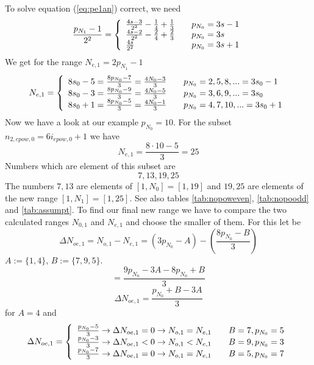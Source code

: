 \documentclass{aomart}
\theoremstyle{definition}
\begin{document}
To solve equation (\ref{eq:pe1an}) correct, we need
\[ \frac{p_{N_{1}}-1}{2^{2}} = \left\{
	\begin{array}{l@{\quad \quad}l}
	\frac{4s-3}{2^{2}} - \frac{1}{4} + \frac{1}{3} & p_{N_{0}} = 3s - 1 \\
	\frac{4s-2}{2^{2}} - \frac{2}{4} + \frac{2}{3} & p_{N_{0}} = 3s \\
	\frac{4s}{2^{2}} & p_{N_{0}} = 3s+1   
\end{array}
\right. \] 
We get for the range $N_{e,1} = 2p_{N_{1}}-1$
\begin{equation} N_{e,1} = \left\{
	\begin{array}{l@{\quad \quad}l}
	8s_{0}-5 = \frac{8p_{N_{0}}-7}{3} = \frac{4N_{0}-3}{3} & p_{N_{0}}=2,5,8,... = 3s_{0} - 1 \\
	8s_{0}-3 = \frac{8p_{N_{0}}-9}{3} = \frac{4N_{0}-5}{3} & p_{N_{0}}=3,6,9,... = 3s_{0} \\
	8s_{0}+1 = \frac{8p_{N_{0}}-5}{3} = \frac{4N_{0}-1}{3} & p_{N_{0}}=4,7,10,... = 3s_{0} + 1  
\end{array}
\right. \label{eq:Ne1} \end{equation}
Now we have a look at our example $p_{N_{0}} = 10$. For the subset $n_{2,epow,0} = 6i_{epow,0} + 1$ we have
\[ N_{e,1} = \frac{8 \cdot 10 - 5}{3} = 25 \]
Numbers which are element of this subset are
\[ 7, 13, 19, 25 \]
The numbers $7,13$ are elements of $[1,N_{0}]=[1,19]$ and $19,25$ are elements of the new range $[1,N_{1}]=[1,25]$. See also tables \ref{tab:nopoweven}, \ref{tab:nopoodd} and \ref{tab:assumpt}.
To find our final new range we have to compare the two calculated ranges $N_{0,1}$ and $N_{e,1}$ and choose the smaller of them. For this let be
\[ \Delta N_{oe,1} = N_{o,1} - N_{e,1} = \left( 3p_{N_{0}} - A \right) - \left( \frac{8p_{N_{0}}-B}{3} \right) \]
$A := \{1,4\}$, $B := \{ 7,9,5 \}$. 
\[ = \frac{9p_{N_{0}}-3A-8p_{N_{0}}+B}{3} \]
\begin{equation} \Delta N_{oe,1} = \frac{p_{N_{0}}+B-3A}{3} \label{eq:deltanoe1} \end{equation}
for $A=4$ and 
\begin{equation} \Delta N_{oe,1} = \left\{
	\begin{array}{l@{\quad \quad}l}
	\frac{p_{N_{0}}-5}{3} \rightarrow \Delta N_{oe,1} = 0 \rightarrow N_{o,1} = N_{e,1} & B=7, p_{N_{0}}=5 \\
	\frac{p_{N_{0}}-3}{3} \rightarrow \Delta N_{oe,1} < 0 \rightarrow N_{o,1} < N_{e,1} & B=9, p_{N_{0}}=3 \\
	\frac{p_{N_{0}}-7}{3} \rightarrow \Delta N_{oe,1} = 0 \rightarrow N_{o,1} = N_{e,1} & B=5, p_{N_{0}}=7  
\end{array}
\right. \label{eq:deltaone1cases}\end{equation} 
\end{document}
